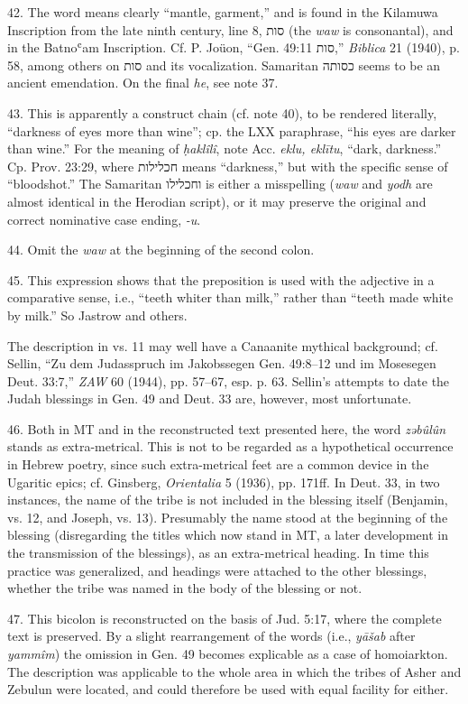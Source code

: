 \begin{enumerate}
42. The word means clearly ``mantle, garment,'' and is found in the Kilamuwa
Inscription from the late ninth century, line 8, סות (the \emph{waw} is
consonantal), and in the Batnoʿam Inscription. Cf. P. Joüon, ``Gen. 49:11
סות,'' \emph{Biblica} 21 (1940), p. 58, among others on סות and its
vocalization. Samaritan כסותה seems to be an ancient emendation. On the final
\emph{he}, see note 37.

43. This is apparently a construct chain (cf. note 40), to be rendered
literally, ``darkness of eyes more than wine''; cp. the LXX paraphrase, ``his
eyes are darker than wine.'' For the meaning of \emph{ḥaklîlî}, note Acc.
\emph{eklu, eklītu}, ``dark, darkness.'' Cp. Prov. 23:29, where חכלילות means
``darkness,'' but with the specific sense of ``bloodshot.'' The Samaritan
וחכלילו is either a misspelling (\emph{waw} and \emph{yodh} are almost
identical in the Herodian script), or it may preserve the original and correct
nominative case ending, \emph{-u}.

44. Omit the \emph{waw} at the beginning of the second colon.

45. This expression shows that the preposition is used with the adjective in a
comparative sense, i.e., ``teeth whiter than milk,'' rather than ``teeth made
white by milk.'' So Jastrow and others.

The description in vs. 11 may well have a Canaanite mythical background; cf.
Sellin, ``Zu dem Judasspruch im Jakobssegen Gen. 49:8--12 und im Mosesegen
Deut. 33:7,'' \emph{ZAW} 60 (1944), pp. 57--67, esp. p. 63. Sellin's attempts
to date the Judah blessings in Gen. 49 and Deut. 33 are, however, most
unfortunate.

46. Both in MT and in the reconstructed text presented here, the word
\emph{zəbûlûn} stands as extra-metrical. This is not to be regarded as a
hypothetical occurrence in Hebrew poetry, since such extra-metrical feet are a
common device in the Ugaritic epics; cf. Ginsberg, \emph{Orientalia} 5 (1936),
pp. 171ff. In Deut. 33, in two instances, the name of the tribe is not included
in the blessing itself (Benjamin, vs. 12, and Joseph, vs. 13). Presumably the
name stood at the beginning of the blessing (disregarding the titles which now
stand in MT, a later development in the transmission of the blessings), as an
extra-metrical heading. In time this practice was generalized, and headings
were attached to the other blessings, whether the tribe was named in the body
of the blessing or not.

47. This bicolon is reconstructed on the basis of Jud. 5:17, where the complete
text is preserved. By a slight rearrangement of the words (i.e., \emph{yāšab}
after \emph{yammîm}) the omission in Gen. 49 becomes explicable as a case of
homoiarkton. The description was applicable to the whole area in which the
tribes of Asher and Zebulun were located, and could therefore be used with
equal facility for either.


\end{enumerate}
